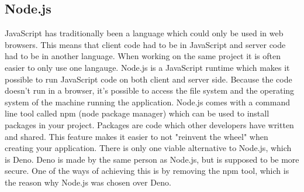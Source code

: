 \subsection{Node.js}
JavaScript has traditionally been a language which could only be used in web browsers. This means that client code had to be in JavaScript and server code had to be in another language. When working on the same project it is often easier to only use one langauge. Node.js\cite{nodejs} is a JavaScript runtime which makes it possible to run JavaScript code on both client and server side. Because the code doesn't run in a browser, it's possible to access the file system and the operating system of the machine running the application. Node.js comes with a command line tool called npm\cite{npm} (node package manager) which can be used to install packages in your project. Packages are code which other developers have written and shared. This feature makes it easier to not "reinvent the wheel" when creating your application. There is only one viable alternative to Node.js, which is Deno\cite{deno}. Deno is made by the same person as Node.js, but is supposed to be more secure. One of the ways of achieving this is by removing the npm tool, which is the reason why Node.js was chosen over Deno.